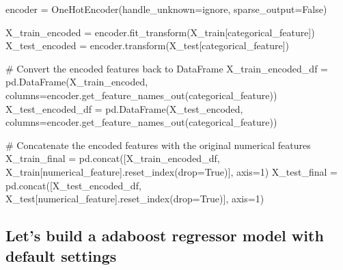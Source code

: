 \documentclass[
  letterpaper,
  DIV=11,
  numbers=noendperiod]{scrreprt}
\newenvironment{Shaded}{\begin{snugshade}}{\end{snugshade}}
\newcommand{\CommentTok}[1]{\textcolor[rgb]{0.37,0.37,0.37}{#1}}
\newcommand{\DecValTok}[1]{\textcolor[rgb]{0.68,0.00,0.00}{#1}}
\newcommand{\NormalTok}[1]{\textcolor[rgb]{0.00,0.23,0.31}{#1}}
\newcommand{\OperatorTok}[1]{\textcolor[rgb]{0.37,0.37,0.37}{#1}}
\newcommand{\StringTok}[1]{\textcolor[rgb]{0.13,0.47,0.30}{#1}}
\newcommand{\VariableTok}[1]{\textcolor[rgb]{0.07,0.07,0.07}{#1}}
\begin{document}
\begin{Shaded}
\begin{Highlighting}[]
\NormalTok{encoder }\OperatorTok{=}\NormalTok{ OneHotEncoder(handle\_unknown}\OperatorTok{=}\StringTok{\textquotesingle{}ignore\textquotesingle{}}\NormalTok{, sparse\_output}\OperatorTok{=}\VariableTok{False}\NormalTok{)}

\NormalTok{X\_train\_encoded }\OperatorTok{=}\NormalTok{ encoder.fit\_transform(X\_train[categorical\_feature])}
\NormalTok{X\_test\_encoded }\OperatorTok{=}\NormalTok{ encoder.transform(X\_test[categorical\_feature])}

\CommentTok{\# Convert the encoded features back to DataFrame}
\NormalTok{X\_train\_encoded\_df }\OperatorTok{=}\NormalTok{ pd.DataFrame(X\_train\_encoded, columns}\OperatorTok{=}\NormalTok{encoder.get\_feature\_names\_out(categorical\_feature))}
\NormalTok{X\_test\_encoded\_df }\OperatorTok{=}\NormalTok{ pd.DataFrame(X\_test\_encoded, columns}\OperatorTok{=}\NormalTok{encoder.get\_feature\_names\_out(categorical\_feature))}

\CommentTok{\# Concatenate the encoded features with the original numerical features}
\NormalTok{X\_train\_final }\OperatorTok{=}\NormalTok{ pd.concat([X\_train\_encoded\_df, X\_train[numerical\_feature].reset\_index(drop}\OperatorTok{=}\VariableTok{True}\NormalTok{)], axis}\OperatorTok{=}\DecValTok{1}\NormalTok{)}
\NormalTok{X\_test\_final }\OperatorTok{=}\NormalTok{ pd.concat([X\_test\_encoded\_df, X\_test[numerical\_feature].reset\_index(drop}\OperatorTok{=}\VariableTok{True}\NormalTok{)], axis}\OperatorTok{=}\DecValTok{1}\NormalTok{)}
\end{Highlighting}
\end{Shaded}

\subsection{Let's build a adaboost regressor model with default
settings}\label{lets-build-a-adaboost-regressor-model-with-default-settings}
\end{document}
